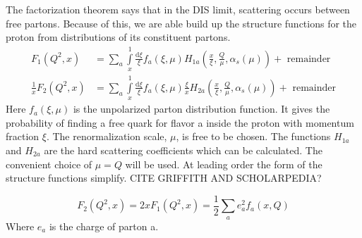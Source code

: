 \documentclass[abstract = on,listof=totoc, bibliography=totoc]{scrreprt}
\begin{document}
The factorization theorem says that in the DIS limit,  scattering occurs between free partons. Because of this, we are able build up the structure functions for the proton from distributions of its constituent partons. 
\begin{eqnarray}
F_1(Q^2,x) &= \sum\limits_a \int\limits_x^1 \frac{\text{d}\xi}{\xi}f_a(\xi,\mu)H_{1a}\left(\frac{x}{\xi},\frac{Q}{\mu}, \alpha_s(\mu)\right) + \text{ remainder}\\
\frac{1}{x}F_2(Q^2,x) &= \sum\limits_a \int\limits_x^1 \frac{\text{d}\xi}{\xi}f_a(\xi,\mu)\frac{\xi}{x}H_{2a}\left(\frac{x}{\xi},\frac{Q}{\mu}, \alpha_s(\mu)\right) + \text{ remainder}
\end{eqnarray} 
Here $f_a(\xi,\mu)$ is the unpolarized parton distribution function. It gives the probability of finding a free quark for flavor a inside the proton with momentum fraction $\xi$. The renormalization scale, $\mu$, is free to be chosen. The functions $H_{1a}$ and $H_{2a}$ are the hard scattering coefficients which can be calculated. The convenient choice of $\mu = Q$ will be used.\cite{factorization} At leading order the form of the structure functions simplify. CITE GRIFFITH AND SCHOLARPEDIA?

\begin{equation}
F_2(Q^2,x) = 2x F_1(Q^2,x) = \frac{1}{2}\sum\limits_a e_a ^2 f_a(x, Q)
\end{equation} 
Where $e_a$ is the charge of parton a.
\end{document}
